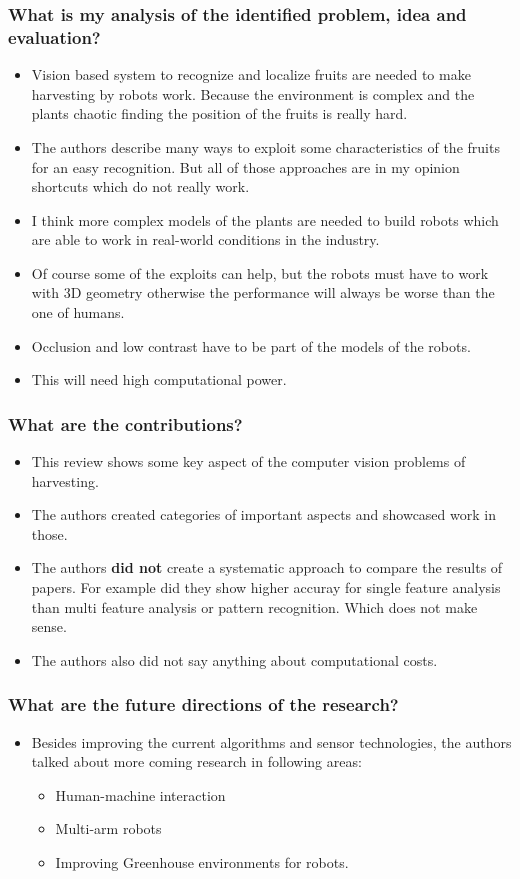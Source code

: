 \subsubsection*{What is my analysis of the identified problem, idea and evaluation?}
\begin{itemize}
    \item Vision based system to recognize and localize fruits are needed to make harvesting by robots work. Because the environment is complex and the plants chaotic finding the position of the fruits is really hard.
    \item The authors describe many ways to exploit some characteristics of the fruits for an easy recognition. But all of those approaches are in my opinion shortcuts which do not really work.
    \item I think more complex models of the plants are needed to build robots which are able to work in real-world conditions in the industry.
    \item Of course some of the exploits can help, but the robots must have to work with 3D geometry otherwise the performance will always be worse than the one of humans. 
    \item Occlusion and low contrast have to be part of the models of the robots.
    \item This will need high computational power.
\end{itemize}
\subsubsection*{What are the contributions?}
\begin{itemize}
    \item This review shows some key aspect of the computer vision problems of harvesting. 
    \item The authors created categories of important aspects and showcased work in those.
    \item The authors \textbf{did not} create a systematic approach to compare the results of papers. For example did they show higher accuray for single feature analysis than multi feature analysis or pattern recognition. Which does not make sense.
    \item The authors also did not say anything about computational costs.
\end{itemize}
\subsubsection*{What are the future directions of the research?}
\begin{itemize}
    \item Besides improving the current algorithms and sensor technologies, the authors talked about more coming research in following areas: \begin{itemize}
        \item Human-machine interaction
        \item Multi-arm robots
        \item Improving Greenhouse environments for robots.
    \end{itemize}
\end{itemize}

